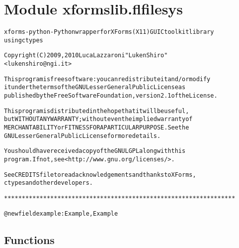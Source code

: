 %
%
%


\section{Module xformslib.flfilesys}

    \label{xformslib:flfilesys}
\begin{alltt}

xforms-python - Python wrapper for XForms (X11) GUI C toolkit library
using ctypes

Copyright (C) 2009, 2010  Luca Lazzaroni "LukenShiro"
    {\textless}lukenshiro@ngi.it{\textgreater}

This program is free software: you can redistribute it and/or modify
it under the terms of the GNU Lesser General Public License as
published by the Free Software Foundation, version 2.1 of the License.

This program is distributed in the hope that it will be useful,
but WITHOUT ANY WARRANTY; without even the implied warranty of
MERCHANTABILITY or FITNESS FOR A PARTICULAR PURPOSE. See the
GNU Lesser General Public License for more details.

You should have received a copy of the GNU LGPL along with this
program. If not, see {\textless}http://www.gnu.org/licenses/{\textgreater}.

See CREDITS file to read acknowledgements and thanks to XForms,
ctypes and other developers.

*****************************************************************


@newfield example: Example, Example
\end{alltt}



  \subsection{Functions}

